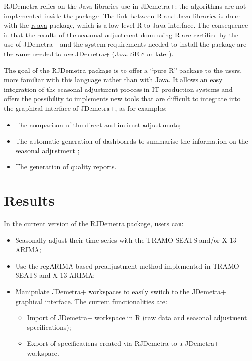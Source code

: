 \documentclass[12pt,a4paper]{article}
\begin{document}
RJDemetra relies on the Java libraries use in JDemetra+: the algorithms
are not implemented inside the package. The link between R and Java
libraries is done with the
\href{https://CRAN.R-project.org/package=rJava}{rJava} package, which is
a low-level R to Java interface. The consequence is that the results of
the seasonal adjustment done using R are certified by the use of JDemetra+
and the system requirements needed to install the package are the same
needed to use JDemetra+ (Java SE 8 or later).

The goal of the RJDemetra package is to offer a ``pure R'' package to
the users, more familiar with this language rather than with Java. It allows an easy integration of the seasonal adjustment process in IT production systems and offers the possibility to implements new tools that are difficult to integrate into the graphical interface of JDemetra+, as for examples:

\begin{itemize}
\item
  The comparison of the direct and indirect adjustments;
\item
  The automatic generation of dashboards to summarise the information on the seasonal adjustment ;
\item
  The generation of quality reports.
\end{itemize}

\section{Results}\label{results}

In the current version of the RJDemetra package, users can:

\begin{itemize}
\item
  Seasonally adjust their time series with the TRAMO-SEATS and/or X-13-ARIMA;
\item
  Use the regARIMA-based preadjustment method implemented in TRAMO-SEATS and X-13-ARIMA;
\item
  Manipulate JDemetra+ workspaces to easily switch to the JDemetra+ graphical interface. The current functionalities are:

  \begin{itemize}
  \item
    Import of JDemetra+ workspace in R (raw data and seasonal adjustment specifications);
  \item
    Export of specifications created via RJDemetra to a JDemetra+ workspace.
  \end{itemize}
\end{itemize}
\end{document}
